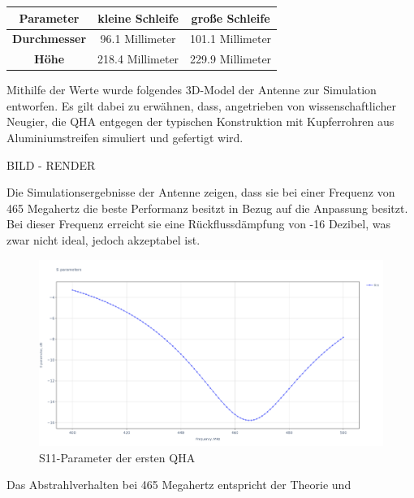 \begin{center}
\begin{tabular}{|c|c|c|}
	\hline
	\textbf{Parameter} & \textbf{kleine Schleife} & \textbf{große Schleife} \\
	\hline
	\textbf{Durchmesser} & 96.1 Millimeter & 101.1 Millimeter \\
	\hline
	\textbf{Höhe} & 218.4 Millimeter & 229.9 Millimeter \\
	\hline
\end{tabular}
\end{center}

Mithilfe der Werte wurde folgendes 3D-Model der Antenne zur Simulation entworfen. Es gilt dabei zu erwähnen, dass, angetrieben von wissenschaftlicher Neugier, die QHA entgegen der typischen Konstruktion mit Kupferrohren aus Aluminiumstreifen simuliert und gefertigt wird. 

BILD - RENDER

Die Simulationsergebnisse der Antenne zeigen, dass sie bei einer Frequenz von 465 Megahertz die beste Performanz besitzt in Bezug auf die Anpassung besitzt. Bei dieser Frequenz erreicht sie eine Rückflussdämpfung von -16 Dezibel, was zwar nicht ideal, jedoch akzeptabel ist.

\begin{figure} [H]
	\centering
	\includegraphics[width=\linewidth]{../ref/qfh_old_s11.png}
	\caption{S11-Parameter der ersten QHA}
	\label{fig:s11_old_qha}
\end{figure}

Das Abstrahlverhalten bei 465 Megahertz entspricht der Theorie und 

